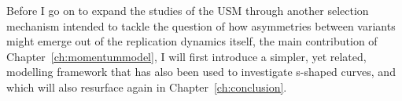 Before I go on to expand the studies of the USM through another selection mechanism intended to tackle the question of how asymmetries between variants might emerge out of the replication dynamics itself, the main contribution of Chapter~\ref{ch:momentummodel}, I will first introduce a simpler, yet related, modelling framework that has also been used to investigate s-shaped curves, and which will also resurface again in Chapter~\ref{ch:conclusion}.

